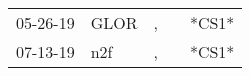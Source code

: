 \begin{supertabular}{p{0.07\textwidth}p{0.06\textwidth}p{0.02\textwidth}p{0.02\textwidth}p{0.06\textwidth}}
 05-26-19\textsuperscript{} &  GLOR\textsuperscript{} &  , &   &  *CS1* \\
 07-13-19\textsuperscript{} &   n2f\textsuperscript{} &  , &   &  *CS1* \\
\end{supertabular}
